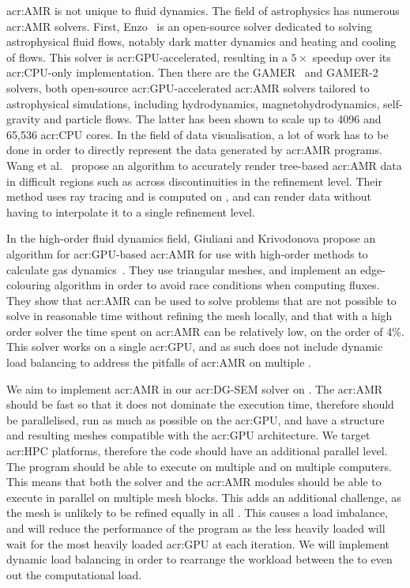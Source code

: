 \Acrlong{acr:AMR} is not unique to fluid dynamics. The field of astrophysics has numerous
\acrshort{acr:AMR} solvers. First, Enzo~\cite{Bryan2014} is an open-source solver dedicated to
solving astrophysical fluid flows, notably dark matter dynamics and heating and cooling of flows.
This solver is \acrshort{acr:GPU}-accelerated, resulting in a \(5 \times \) speedup over its
\acrshort{acr:CPU}-only implementation. Then there are the GAMER~\cite{Schive2010} and
GAMER-2~\cite{Schive2018} solvers, both open-source \acrshort{acr:GPU}-accelerated
\acrshort{acr:AMR} solvers tailored to astrophysical simulations, including hydrodynamics,
magnetohydrodynamics, self-gravity and particle flows. The latter has been shown to scale up to 4096
 and 65,536 \acrshort{acr:CPU} cores. In the field of data visualisation, a lot
of work has to be done in order to directly represent the data generated by \acrshort{acr:AMR}
programs. Wang et al.~\cite{Wang2020} propose an algorithm to accurately render tree-based
\acrshort{acr:AMR} data in difficult regions such as across discontinuities in the refinement level.
Their method uses ray tracing and is computed on , and can render data without
having to interpolate it to a single refinement level.

In the high-order fluid dynamics field, Giuliani and Krivodonova propose an algorithm for
\acrshort{acr:GPU}-based \acrlong{acr:AMR} for use with high-order methods to calculate gas
dynamics~\cite{Giuliani2019}. They use triangular meshes, and implement an edge-colouring algorithm
in order to avoid race conditions when computing fluxes. They show that \acrshort{acr:AMR} can be
used to solve problems that are not possible to solve in reasonable time without refining the mesh
locally, and that with a high order solver the time spent on \acrshort{acr:AMR} can be relatively
low, on the order of 4\%. This solver works on a single \acrshort{acr:GPU}, and as such does not
include dynamic load balancing to address the pitfalls of \acrshort{acr:AMR} on multiple
.

We aim to implement \acrshort{acr:AMR} in our \acrshort{acr:DG-SEM} solver on .
The \acrshort{acr:AMR} should be fast so that it does not dominate the execution time, therefore
should be parallelised, run as much as possible on the \acrshort{acr:GPU}, and have a structure and
resulting meshes compatible with the \acrshort{acr:GPU} architecture. We target \acrshort{acr:HPC}
platforms, therefore the code should have an additional parallel level. The program should be able
to execute on multiple  and on multiple computers. This means that both the
solver and the \acrshort{acr:AMR} modules should be able to execute in parallel on multiple mesh
blocks. This adds an additional challenge, as the mesh is unlikely to be refined equally in all
. This causes a load imbalance, and will reduce the performance of the program
as the less heavily loaded  will wait for the most heavily loaded
\acrshort{acr:GPU} at each iteration. We will implement dynamic load balancing in order to rearrange
the workload between the  to even out the computational load.

